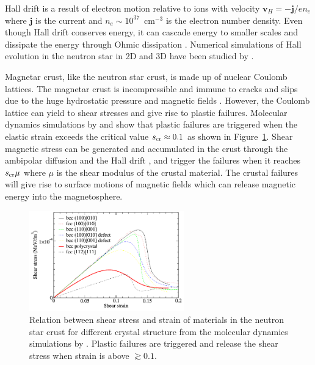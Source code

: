 Hall drift is a result of electron motion relative to ions with velocity $\boldsymbol{v}_H = -\boldsymbol{j}/en_e$ where $\boldsymbol{j}$ is the current and $n_e\sim 10^{37}$~cm$^{-3}$ is the electron number density.
Even though Hall drift conserves energy, it can cascade energy to smaller scales and dissipate the energy through Ohmic dissipation \citep{1992ApJ...395..250G}.
Numerical simulations of Hall evolution in the neutron star in 2D and 3D have been studied by \citep{2009A&A...496..207P, 2016PNAS..113.3944G,2018MNRAS.473.2771B}.

Magnetar crust, like the neutron star crust, is made up of nuclear Coulomb lattices.
The magnetar crust is incompressible and immune to cracks and slips due to the huge hydrostatic pressure \citep{2003ApJ...595..342J} and magnetic fields \citep{2012MNRAS.427.1574L}.
However, the Coulomb lattice can yield to shear stresses and give rise to plastic failures.
Molecular dynamics simulations by \citet{2009PhRvL.102s1102H} and \citet{2010MNRAS.407L..54C} show that plastic failures are triggered when the elastic strain exceeds the critical value $s_{\rm cr}\approx 0.1$ as shown in Figure~\ref{fig:plastic-md}.
Shear magnetic stress can be generated and accumulated in the crust through the ambipolar diffusion and the Hall drift \citep{1996ApJ...473..322T,2011ApJ...727L..51P}, and trigger the failures when it reaches $s_{\rm cr}\mu$ where $\mu$ is the shear modulus of the crustal material.
The crustal failures will give rise to surface motions of magnetic fields which can release magnetic energy into the magnetosphere.
%
\begin{figure}[h]
  \centering
  \includegraphics[width=0.6\textwidth]{pics/intro/plastic.png}
  \caption[Relation between shear stress and strain of materials in the neutron star crust]{Relation between shear stress and strain of materials in the neutron star crust for different crystal structure from the molecular dynamics simulations by \citet{2009PhRvL.102s1102H}.
  Plastic failures are triggered and release the shear stress when strain is above $\gtrsim 0.1$.}
  \label{fig:plastic-md}
\end{figure}
%

